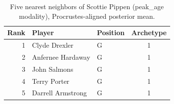 \begin{table}[htbp]
  \centering\small
  \begin{tabular}{rllc}
    \toprule
    Rank & Player & Position & Archetype \\
    \midrule
    1 & Clyde Drexler & G & 1 \\
    2 & Anfernee Hardaway & G & 1 \\
    3 & John Salmons & G & 1 \\
    4 & Terry Porter & G & 1 \\
    5 & Darrell Armstrong & G & 1 \\
    \bottomrule
  \end{tabular}
  \caption{Five nearest neighbors of Scottie Pippen (peak_age modality), Procrustes-aligned posterior mean.}
  \label{tab:Scottie_Pippen_neighbors_peak_age}
\end{table}

